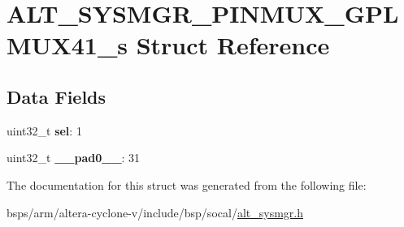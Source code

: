 \hypertarget{structALT__SYSMGR__PINMUX__GPLMUX41__s}{}\section{A\+L\+T\+\_\+\+S\+Y\+S\+M\+G\+R\+\_\+\+P\+I\+N\+M\+U\+X\+\_\+\+G\+P\+L\+M\+U\+X41\+\_\+s Struct Reference}
\label{structALT__SYSMGR__PINMUX__GPLMUX41__s}
\subsection*{Data Fields}
\begin{DoxyCompactItemize}
\item 
\mbox{\label{structALT__SYSMGR__PINMUX__GPLMUX41__s_a2ad9cbbc0abbb5eed27980b3ff6bc7ed}} 
uint32\+\_\+t {\bfseries sel}\+: 1
\item 
\mbox{\label{structALT__SYSMGR__PINMUX__GPLMUX41__s_abd02bb170b5d3a993fb481f8f284e1e8}} 
uint32\+\_\+t {\bfseries \+\_\+\+\_\+pad0\+\_\+\+\_\+}\+: 31
\end{DoxyCompactItemize}


The documentation for this struct was generated from the following file\+:\begin{DoxyCompactItemize}
\item 
bsps/arm/altera-\/cyclone-\/v/include/bsp/socal/\mbox{\hyperlink{alt__sysmgr_8h}{alt\+\_\+sysmgr.\+h}}\end{DoxyCompactItemize}
